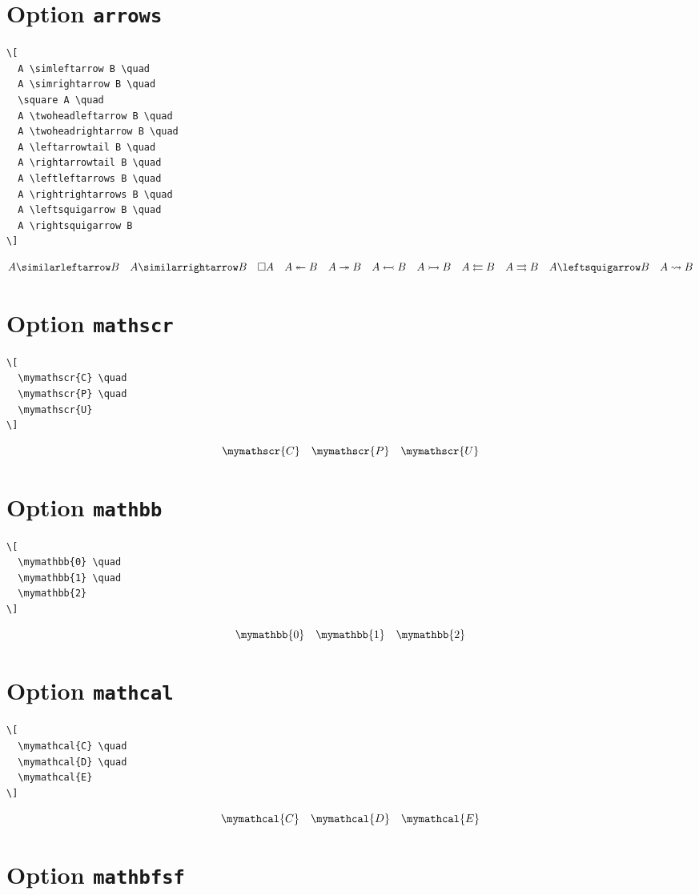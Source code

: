 \documentclass{article}
\begin{document}
\section{Option \texttt{arrows}}

\begin{verbatim}
\[
  A \simleftarrow B \quad
  A \simrightarrow B \quad
  \square A \quad
  A \twoheadleftarrow B \quad
  A \twoheadrightarrow B \quad
  A \leftarrowtail B \quad
  A \rightarrowtail B \quad
  A \leftleftarrows B \quad
  A \rightrightarrows B \quad
  A \leftsquigarrow B \quad
  A \rightsquigarrow B
\]
\end{verbatim}
%
\[
  A \simleftarrow B \quad
  A \simrightarrow B \quad
  \square A \quad
  A \twoheadleftarrow B \quad
  A \twoheadrightarrow B \quad
  A \leftarrowtail B \quad
  A \rightarrowtail B \quad
  A \leftleftarrows B \quad
  A \rightrightarrows B \quad
  A \leftsquigarrow B \quad
  A \rightsquigarrow B
\]

\section{Option \texttt{mathscr}}

\begin{verbatim}
\[
  \mymathscr{C} \quad
  \mymathscr{P} \quad
  \mymathscr{U}
\]
\end{verbatim}
%
\[
  \mymathscr{C} \quad
  \mymathscr{P} \quad
  \mymathscr{U}
\]

\section{Option \texttt{mathbb}}

\begin{verbatim}
\[
  \mymathbb{0} \quad
  \mymathbb{1} \quad
  \mymathbb{2}
\]
\end{verbatim}
%
\[
  \mymathbb{0} \quad
  \mymathbb{1} \quad
  \mymathbb{2}
\]

\section{Option \texttt{mathcal}}

\begin{verbatim}
\[
  \mymathcal{C} \quad
  \mymathcal{D} \quad
  \mymathcal{E}
\]
\end{verbatim}
%
\[
  \mymathcal{C} \quad
  \mymathcal{D} \quad
  \mymathcal{E}
\]

\section{Option \texttt{mathbfsf}}
\end{document}
